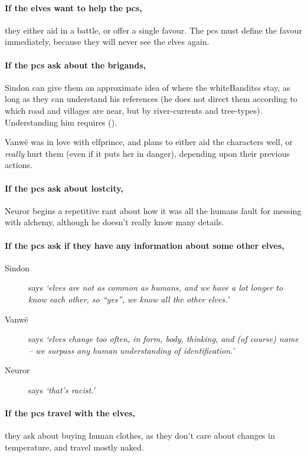 \paragraph{If the elves want to help the \glspl{pc},}
they either aid in a battle, or offer a single favour.
The \glspl{pc} must define the favour immediately, because they will never see the elves again.



\paragraph{If the \glspl{pc} ask about the brigands,}
Sindon can give them an approximate idea of where the \glspl{whiteBandits} stay, as long as they can understand his references (he does not direct them according to which road and \glspl{village} are near, but by river-currents and tree-types).
Understanding him requires  (\tn[10]).



Vanw\"e was in love with \gls{elfprince}, and plans to either aid the characters well, or \emph{really} hurt them (even if it puts her in danger), depending upon their previous actions.

\label{neuror}


\paragraph{If the \glspl{pc} ask about \gls{lostcity},}
Neuror begins a repetitive rant about how it was all the humans fault for messing with alchemy, although he doesn't really know many details.

\paragraph{If the \glspl{pc} ask if they have any information about some other elves,}

\begin{description}
  \item[Sindon] says \textit{`elves are not as common as humans, and we have a lot longer to know each other, so ``yes'', we know all the other elves.'}
  \item[Vanw\"e] says \textit{`elves change too often, in form, body, thinking, and (of course) name -- we surpass any human understanding of identification.'}
  \item[Neuror] says \textit{`that's racist.'}
\end{description}

\paragraph{If the \glspl{pc} travel with the elves,}
they ask about buying human clothes, as they don't care about changes in temperature, and travel mostly naked.%
